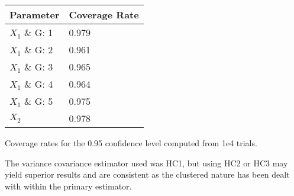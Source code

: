 \begin{threeparttable}
	\begin{tabularx}{\textwidth}{Y Y}
		\toprule
		\textbf{Parameter} & \textbf{Coverage Rate}\\
		\midrule
		$X_{1}$ \& G: 1 & 0.979 \\
		$X_{1}$ \& G: 2 & 0.961 \\
		$X_{1}$ \& G: 3 & 0.965 \\
	    $X_{1}$ \& G: 4 & 0.964 \\
	    $X_{1}$ \& G: 5 & 0.975 \\
	    $X_{2}$         & 0.978	\\
		\bottomrule
	\end{tabularx}
	\begin{tablenotes}
		\small
		\item Coverage rates for the 0.95 confidence level computed from 1e4 trials.
		\item The variance covariance estimator used was HC1, but using HC2 or HC3 may yield superior results and are consistent as the clustered nature has been dealt with within the primary estimator.
	\end{tablenotes}
\end{threeparttable}